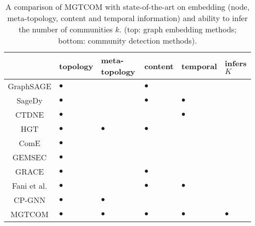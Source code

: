 \begin{table}[t]
\centering
\caption{
    A comparison of MGTCOM with state-of-the-art on embedding (node, meta-topology, content and temporal information) and ability to infer the number of communities $k$. (top: graph embedding methods; bottom: community detection methods).
    \label{tab:comparison_related_work}
}
    \begin{tabular}{c|C{1.5cm}|C{1.5cm}|C{1.5cm}|C{1.5cm}|C{1.5cm}}
        \hline
        & topology & meta-topology    & content  & temporal   & infers $K$  \\ \hline
        GraphSAGE \cite{wuSageDyNovelSampling2021}
        & $\bullet$   &                     & $\bullet$      &                  &           \\
        SageDy \cite{wuSageDyNovelSampling2021}
        & $\bullet$   &                     & $\bullet$      & $\bullet$        &           \\
        CTDNE \cite{nguyenContinuousTimeDynamicNetwork2018}
        & $\bullet$   &                     &                & $\bullet$        &           \\
        HGT \cite{huHeterogeneousGraphTransformer2020}
        & $\bullet$   & $\bullet$           & $\bullet$      &                  &           \\ \hline\hline
        ComE \cite{cavallariLearningCommunityEmbedding2017}
        & $\bullet$   &                     &                &                  &           \\
        GEMSEC \cite{rozemberczkiGEMSECGraphEmbedding2019}
        & $\bullet$   &                     &                &                  &           \\
        GRACE \cite{yangGraphClusteringDynamic2017}
        & $\bullet$   &                     & $\bullet$      &                  &           \\
        Fani et al. \cite{faniUserCommunityDetection2020}
        & $\bullet$   &                     & $\bullet$      & $\bullet$        &           \\
        CP-GNN \cite{luoDetectingCommunitiesHeterogeneous2021}
        & $\bullet$   & $\bullet$           &                &                  &           \\
        MGTCOM%
        & $\bullet$   & $\bullet$           & $\bullet$      & $\bullet$        & $\bullet$ \\\hline
    \end{tabular}
\end{table}